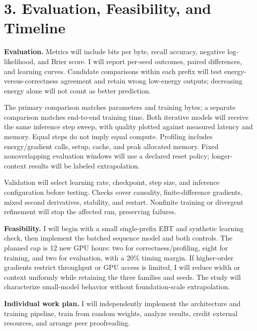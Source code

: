 \documentclass[11pt,letterpaper]{article}
\begin{document}
\newpage
\section*{3. Evaluation, Feasibility, and Timeline}

\textbf{Evaluation.} Metrics will include bits per byte, recall accuracy, negative log-likelihood, and Brier score. I will report per-seed outcomes, paired differences, and learning curves. Candidate comparisons within each prefix will test energy-versus-correctness agreement and retain wrong low-energy outputs; decreasing energy alone will not count as better prediction.

The primary comparison matches parameters and training bytes; a separate comparison matches end-to-end training time. Both iterative models will receive the same inference step sweep, with quality plotted against measured latency and memory. Equal steps do not imply equal compute. Profiling includes energy/gradient calls, setup, cache, and peak allocated memory. Fixed nonoverlapping evaluation windows will use a declared reset policy; longer-context results will be labeled extrapolation.

Validation will select learning rate, checkpoint, step size, and inference configuration before testing. Checks cover causality, finite-difference gradients, mixed second derivatives, stability, and restart. Nonfinite training or divergent refinement will stop the affected run, preserving failures.

\textbf{Feasibility.} I will begin with a small single-prefix EBT and synthetic learning check, then implement the batched sequence model and both controls. The planned cap is 12 new GPU hours: two for correctness/profiling, eight for training, and two for evaluation, with a 20\% timing margin. If higher-order gradients restrict throughput or GPU access is limited, I will reduce width or context uniformly while retaining the three families and seeds. The study will characterize small-model behavior without foundation-scale extrapolation.

\textbf{Individual work plan.} I will independently implement the architecture and training pipeline, train from random weights, analyze results, credit external resources, and arrange peer proofreading.
\end{document}
